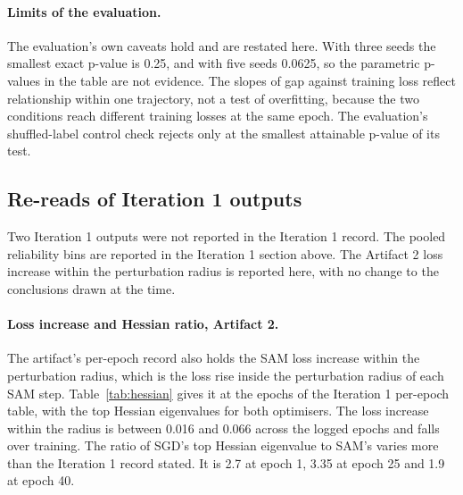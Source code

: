 \documentclass[11pt,letterpaper]{article}
\begin{document}
\paragraph{Limits of the evaluation.} The evaluation's own caveats hold and are restated here. With three seeds the smallest exact p-value is 0.25, and with five seeds 0.0625, so the parametric p-values in the table are not evidence. The slopes of gap against training loss reflect relationship within one trajectory, not a test of overfitting, because the two conditions reach different training losses at the same epoch. The evaluation's shuffled-label control check rejects only at the smallest attainable p-value of its test.

\subsection{Re-reads of Iteration 1 outputs}

Two Iteration 1 outputs were not reported in the Iteration 1 record. The pooled reliability bins are reported in the Iteration 1 section above. The Artifact 2 loss increase within the perturbation radius is reported here, with no change to the conclusions drawn at the time.

\paragraph{Loss increase and Hessian ratio, Artifact 2.} The artifact's per-epoch record also holds the SAM loss increase within the perturbation radius, which is the loss rise inside the perturbation radius of each SAM step. Table~\ref{tab:hessian} gives it at the epochs of the Iteration 1 per-epoch table, with the top Hessian eigenvalues for both optimisers. The loss increase within the radius is between 0.016 and 0.066 across the logged epochs and falls over training. The ratio of SGD's top Hessian eigenvalue to SAM's varies more than the Iteration 1 record stated. It is 2.7 at epoch 1, 3.35 at epoch 25 and 1.9 at epoch 40.
\end{document}
